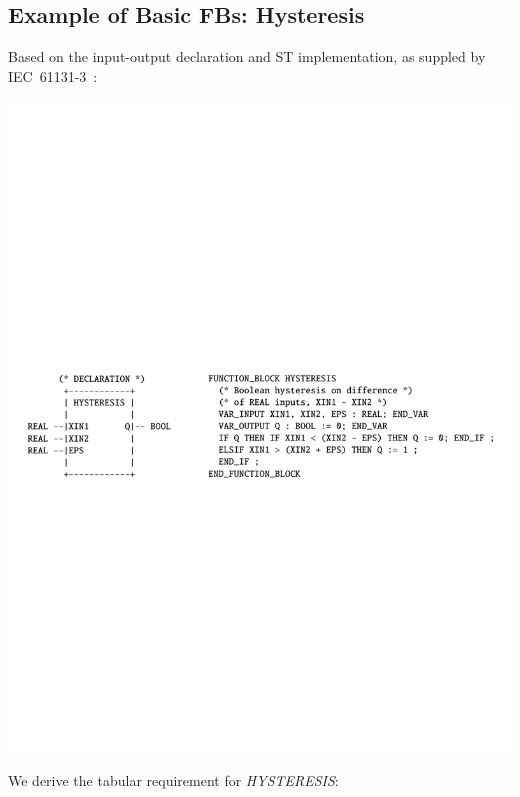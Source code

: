 \documentclass[a0,landscape]{a0poster}
\def\graphspacing{\vspace{.5cm}}
\newcommand{\capcolor}[1]{{\color{Black} #1}}
\newcommand{\var}[1]{{\small \textit{#1}}}
\begin{document}
\begin{multicols}{4}
{\color{Blue} \subsection*{Example of Basic FBs: Hysteresis}}

\noindent Based on the input-output declaration and ST implementation, as suppled by IEC~61131-3~\cite{IEC:2003:IEP}:

\begin{center}\graphspacing
\includegraphics[width=\linewidth]{figures/hysteresis/hysteresis_decl}
\end{center}\graphspacing

\noindent We derive the tabular requirement for \var{HYSTERESIS}:


\end{multicols}
\end{document}
